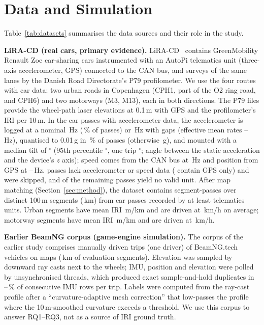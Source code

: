 \section{Data and Simulation}
\label{sec:data}
Table~\ref{tab:datasets} summarises the data sources and their role in the study.

\textbf{LiRA-CD (real cars, primary evidence).}
LiRA-CD~\cite{skar2023lira,lira_data} contains GreenMobility Renault Zoe car-sharing cars instrumented with an AutoPi telematics unit (three-axis accelerometer, GPS) connected to the CAN bus, and surveys of the same lanes by the Danish Road Directorate's P79 profilometer.
We use the four routes with car data: two urban roads in Copenhagen (CPH1, part of the O2 ring road, and CPH6) and two motorways (M3, M13), each in both directions.
The P79 files provide the wheel-path laser elevations at 0.1\,m with GPS and the profilometer's IRI per 10\,m.
In the \liraSensorPasses{} car passes with accelerometer data, the accelerometer is logged at a nominal \liraRateLow\,Hz (\liraRateLowShare\,\% of passes) or \liraRateHigh\,Hz with gaps (effective mean rates \liraRateMeanMin--\liraRateMeanMax\,Hz), quantised to 0.01\,g in \liraLsbShare\,\% of passes (otherwise \liraLsbMin\,g), and mounted with a median tilt of \liraTiltMedian$^\circ$ (95th percentile \liraTiltPninetyfive$^\circ$, one trip \liraTiltMax$^\circ$; angle between the static acceleration and the device's $z$ axis); speed comes from the CAN bus at \liraCanHz\,Hz and position from GPS at \liraGpsHzMin--\liraGpsHzMax\,Hz.
\liraSkipped{} passes lack accelerometer or speed data (\liraGpsOnly{} contain GPS only) and were skipped, and \liraNoUnits{} of the remaining \liraAllSignals{} passes yield no valid unit.
After map matching (Section~\ref{sec:method}), the dataset contains \liraUnits{} segment-passes over \liraSegments{} distinct 100\,m segments (\liraKm{}\,km) from \liraPasses{} car passes recorded by at least \liraDevices{} telematics units.
Urban segments have mean IRI \liraIriUrban{}\,m/km and are driven at \liraSpeedUrban\,km/h on average; motorway segments have mean IRI \liraIriMotorway{}\,m/km and are driven at \liraSpeedMotorway\,km/h.

\textbf{Earlier BeamNG corpus (game-engine simulation).}
The corpus of the earlier study comprises \bngTrips{} manually driven trips (one driver) of \bngCars{} BeamNG.tech vehicles on \bngMaps{} maps (\bngKm{}\,km of evaluation segments).
Elevation was sampled by downward ray casts next to the wheels; IMU, position and elevation were polled by unsynchronised threads, which produced exact sample-and-hold duplicates in \bngImuDupMin--\bngImuDupMax\,\% of consecutive IMU rows per trip.
Labels were computed from the ray-cast profile after a ``curvature-adaptive mesh correction'' that low-passes the profile where the 10\,m-smoothed curvature exceeds a threshold.
We use this corpus to answer RQ1--RQ3, not as a source of IRI ground truth.

